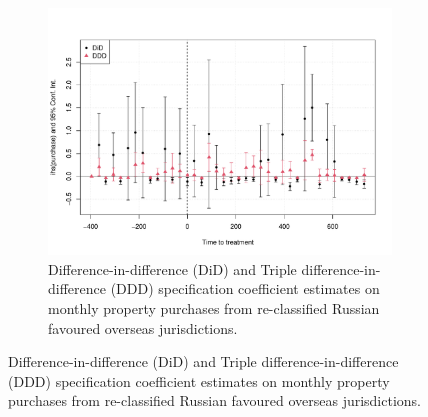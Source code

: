 \documentclass{article}
\begin{document}
\begin{table}[H]
\begin{adjustbox}{width=1.25\textwidth,center}
\begin{threeparttable}
\begin{tablenotes}
\end{tablenotes}
\end{threeparttable}
\end{adjustbox}
\end{table}


\begin{figure}[H]
    \centering
    \begin{subfigure}[b]{0.8\textwidth}
        \includegraphics[width=\textwidth]{Event_study_Purchase_Russia_Robust.pdf}
        \caption{Difference-in-difference (DiD) and Triple difference-in-difference (DDD) specification coefficient estimates on monthly property purchases from re-classified Russian favoured overseas jurisdictions.}
        \label{fig:purchase-event}
    \end{subfigure}
    
    \vspace{1cm}
    

\end{figure}
\end{document}
